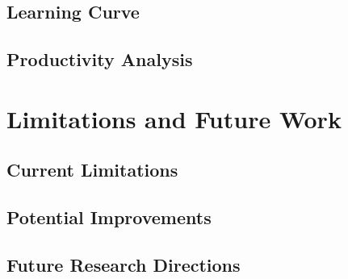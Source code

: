 \subsection{Learning Curve}

\subsection{Productivity Analysis}

\section{Limitations and Future Work}

\subsection{Current Limitations}

\subsection{Potential Improvements}

\subsection{Future Research Directions} 